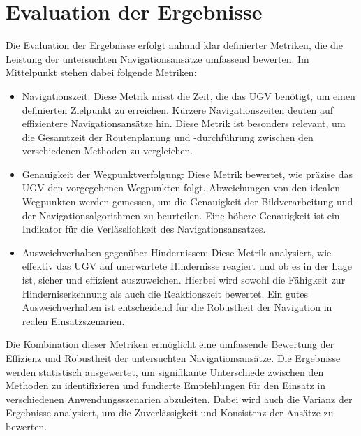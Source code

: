 \section{Evaluation der Ergebnisse}

Die Evaluation der Ergebnisse erfolgt anhand klar definierter Metriken, die die Leistung der untersuchten Navigationsansätze umfassend bewerten. 
Im Mittelpunkt stehen dabei folgende Metriken:

\begin{itemize}
    \item Navigationszeit: Diese Metrik misst die Zeit, die das \ac{UGV} benötigt, um einen definierten Zielpunkt zu erreichen. Kürzere Navigationszeiten deuten auf effizientere Navigationsansätze hin. Diese Metrik ist besonders relevant, um die Gesamtzeit der Routenplanung und -durchführung zwischen den verschiedenen Methoden zu vergleichen.
    
    \item Genauigkeit der Wegpunktverfolgung: Diese Metrik bewertet, wie präzise das \ac{UGV} den vorgegebenen Wegpunkten folgt. Abweichungen von den idealen Wegpunkten werden gemessen, um die Genauigkeit der Bildverarbeitung und der Navigationsalgorithmen zu beurteilen. Eine höhere Genauigkeit ist ein Indikator für die Verlässlichkeit des Navigationsansatzes.
    
    \item Ausweichverhalten gegenüber Hindernissen: Diese Metrik analysiert, wie effektiv das \ac{UGV} auf unerwartete Hindernisse reagiert und ob es in der Lage ist, sicher und effizient auszuweichen. Hierbei wird sowohl die Fähigkeit zur Hinderniserkennung als auch die Reaktionszeit bewertet. Ein gutes Ausweichverhalten ist entscheidend für die Robustheit der Navigation in realen Einsatzszenarien.
\end{itemize}

Die Kombination dieser Metriken ermöglicht eine umfassende Bewertung der Effizienz und Robustheit der untersuchten Navigationsansätze. 
Die Ergebnisse werden statistisch ausgewertet, um signifikante Unterschiede zwischen den Methoden zu identifizieren und fundierte Empfehlungen für den Einsatz in verschiedenen Anwendungsszenarien abzuleiten. 
Dabei wird auch die Varianz der Ergebnisse analysiert, um die Zuverlässigkeit und Konsistenz der Ansätze zu bewerten.
